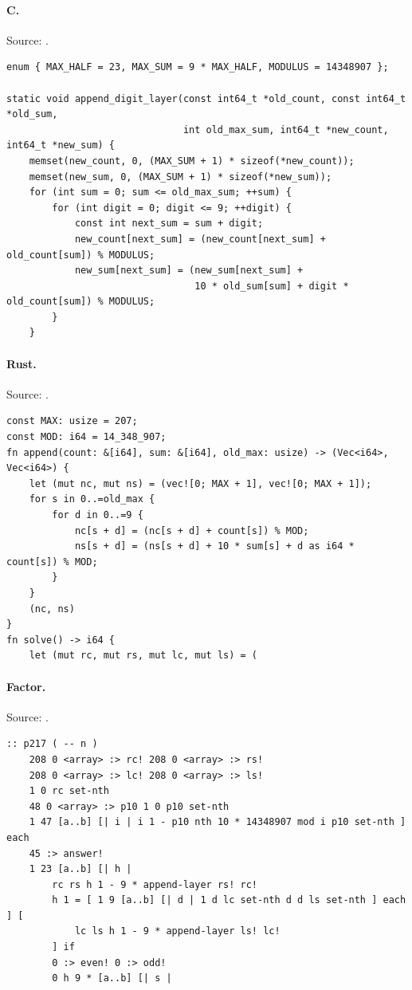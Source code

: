 \paragraph{C.} Source: .
\begin{lstlisting}
enum { MAX_HALF = 23, MAX_SUM = 9 * MAX_HALF, MODULUS = 14348907 };

static void append_digit_layer(const int64_t *old_count, const int64_t *old_sum,
                               int old_max_sum, int64_t *new_count, int64_t *new_sum) {
    memset(new_count, 0, (MAX_SUM + 1) * sizeof(*new_count));
    memset(new_sum, 0, (MAX_SUM + 1) * sizeof(*new_sum));
    for (int sum = 0; sum <= old_max_sum; ++sum) {
        for (int digit = 0; digit <= 9; ++digit) {
            const int next_sum = sum + digit;
            new_count[next_sum] = (new_count[next_sum] + old_count[sum]) % MODULUS;
            new_sum[next_sum] = (new_sum[next_sum] +
                                 10 * old_sum[sum] + digit * old_count[sum]) % MODULUS;
        }
    }
\end{lstlisting}

\paragraph{Rust.} Source: .
\begin{lstlisting}
const MAX: usize = 207;
const MOD: i64 = 14_348_907;
fn append(count: &[i64], sum: &[i64], old_max: usize) -> (Vec<i64>, Vec<i64>) {
    let (mut nc, mut ns) = (vec![0; MAX + 1], vec![0; MAX + 1]);
    for s in 0..=old_max {
        for d in 0..=9 {
            nc[s + d] = (nc[s + d] + count[s]) % MOD;
            ns[s + d] = (ns[s + d] + 10 * sum[s] + d as i64 * count[s]) % MOD;
        }
    }
    (nc, ns)
}
fn solve() -> i64 {
    let (mut rc, mut rs, mut lc, mut ls) = (
\end{lstlisting}

\paragraph{Factor.} Source: .
\begin{lstlisting}
:: p217 ( -- n )
    208 0 <array> :> rc! 208 0 <array> :> rs!
    208 0 <array> :> lc! 208 0 <array> :> ls!
    1 0 rc set-nth
    48 0 <array> :> p10 1 0 p10 set-nth
    1 47 [a..b] [| i | i 1 - p10 nth 10 * 14348907 mod i p10 set-nth ] each
    45 :> answer!
    1 23 [a..b] [| h |
        rc rs h 1 - 9 * append-layer rs! rc!
        h 1 = [ 1 9 [a..b] [| d | 1 d lc set-nth d d ls set-nth ] each ] [
            lc ls h 1 - 9 * append-layer ls! lc!
        ] if
        0 :> even! 0 :> odd!
        0 h 9 * [a..b] [| s |
\end{lstlisting}

